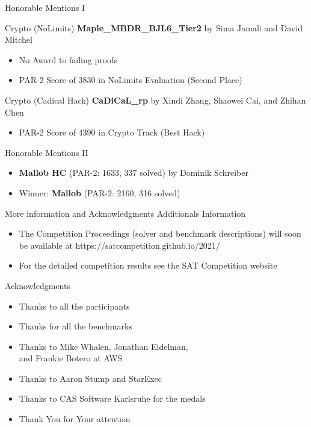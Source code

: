 \documentclass{beamer}
\begin{document}
\begin{frame}{Honorable Mentions I}

\begin{block}{Crypto (NoLimits)}
\textbf{Maple\_MBDR\_BJL6\_Tier2} by Sima Jamali and David Mitchel
\begin{itemize}
\item No Award to failing proofs
\item PAR-2 Score of 3830 in NoLimits Evaluation (Second Place)
\end{itemize}
\end{block}

\begin{block}{Crypto (Cadical Hack)}
\textbf{CaDiCaL\_rp} by Xindi Zhang, Shaowei Cai, and Zhihan Chen
\begin{itemize}
\item PAR-2 Score of 4390 in Crypto Track (Best Hack)
\end{itemize}
\end{block}

\end{frame}


\begin{frame}{Honorable Mentions II}
\begin{itemize}
\item {\bf Mallob HC} (PAR-2: 1633, 337 solved) by Dominik Schreiber
\item Winner: {\bf Mallob} (PAR-2: 2160, 316 solved)
\end{itemize}
\centering
{}
\end{frame}


\begin{frame}{More information and Acknowledgments}
Additionals Information
\begin{itemize}
	\item The Competition Proceedings (solver and benchmark descriptions)
	 will soon be available at https://satcompetition.github.io/2021/
	\item For the detailed competition results see the SAT Competition website
\end{itemize}
\medskip

Acknowledgments
\begin{itemize}
\item Thanks to all the participants
\item Thanks for all the benchmarks
\item Thanks to Mike Whalen, Jonathan Eidelman,\\and Frankie Botero at AWS
\item Thanks to Aaron Stump and StarExec
\item Thanks to CAS Software Karlsruhe for the medals
\end{itemize}
\begin{itemize}
\item Thank You for Your attention
\end{itemize}
\end{frame}


\end{document}
